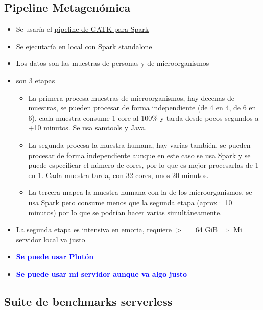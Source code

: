 \documentclass[preprint,3p]{elsarticle}
\begin{document}
\subsection{Pipeline Metagenómica}

\begin{itemize}
	\item Se usaría el \href{https://gatk.broadinstitute.org/hc/en-us/articles/13832627644443-PathSeqPipelineSpark}{pipeline de GATK para Spark}
	\item Se ejecutaría en local con Spark standalone
	\item Los datos son las muestras de personas y de microorganismos
	\item son 3 etapas
	\begin{itemize}
		\item La primera procesa muestras de microorganismos, hay decenas de muestras, se pueden procesar de forma independiente (de 4 en 4, de 6 en 6), cada muestra consume 1 core al 100\% y tarda desde pocos segundos a +10 minutos. Se usa samtools y Java.
		\item La segunda procesa la muestra humana, hay varias también, se pueden procesar de forma independiente aunque en este caso se usa Spark y se puede especificar el número de cores, por lo que es mejor procesarlas de 1 en 1. Cada muestra tarda, con 32 cores, unos 20 minutos.
		\item La tercera mapea la muestra humana con la de los microorganismos, se usa Spark pero consume menos que la segunda etapa (aprox· 10 minutos) por lo que se podrían hacer varias simultáneamente.
	\end{itemize}
	\item La segunda etapa es intensiva en emoria, requiere $>=$ 64 GiB $\Rightarrow$ Mi servidor local va justo
	\item \textcolor{blue}{\textbf{Se puede usar Plutón}}
	\item \textcolor{blue}{\textbf{Se puede usar mi servidor aunque va algo justo}}
\end{itemize}

\subsection{Suite de benchmarks serverless}
\end{document}
